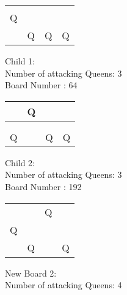 \documentclass[a4paper,10pt]{article}
\begin{document}
\begin{flushleft}
\begin{flushleft}
\begin{flushleft}
\begin{flushleft}
\begin{flushleft}
\begin{flushleft}
\begin{flushleft}
\begin{flushleft}
\begin{flushleft}
\begin{flushleft}
\begin{flushleft}
\begin{flushleft}
    \begin{tabular}{| l | l | l | l |}
    \hline
     & & & \\ \hline
     & & & \\ \hline
     Q & & & \\ \hline
     & Q & Q & Q \\ \hline
    \end{tabular}
\begin{flushleft}
Child 1:\\
Number of attacking Queens: 3 \\
Board Number : 64 \\
\vspace{5mm}
    \begin{tabular}{| l | l | l | l |}
    \hline
     & Q & & \\ \hline
     & & & \\ \hline
     & & & \\ \hline
     Q & & Q & Q \\ \hline
    \end{tabular}
\begin{flushleft}
Child 2:\\
Number of attacking Queens: 3 \\
Board Number : 192 \\
\vspace{5mm}
    \begin{tabular}{| l | l | l | l |}
    \hline
     & & & \\ \hline
     & & Q & \\ \hline
     Q & & & \\ \hline
     & Q & & Q \\ \hline
    \end{tabular}
\begin{flushleft}
New Board 2: \\
Number of attacking Queens: 4\\
\vspace{5mm}


\end{flushleft}
\end{flushleft}
\end{flushleft}
\end{flushleft}
\end{flushleft}
\end{flushleft}
\end{flushleft}
\end{flushleft}
\end{flushleft}
\end{flushleft}
\end{flushleft}
\end{flushleft}
\end{flushleft}
\end{flushleft}
\end{flushleft}
\end{document}

